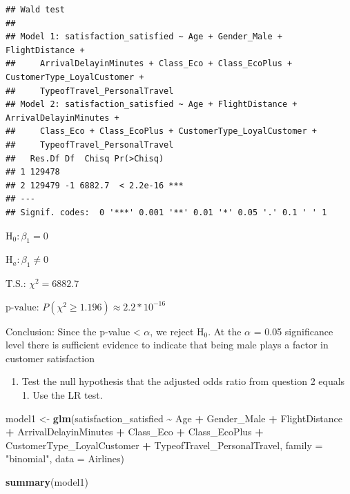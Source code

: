 \documentclass[
]{article}
\newenvironment{Shaded}{\begin{snugshade}}{\end{snugshade}}
\newcommand{\AttributeTok}[1]{\textcolor[rgb]{0.13,0.29,0.53}{#1}}
\newcommand{\FunctionTok}[1]{\textcolor[rgb]{0.13,0.29,0.53}{\textbf{#1}}}
\newcommand{\NormalTok}[1]{#1}
\newcommand{\OtherTok}[1]{\textcolor[rgb]{0.56,0.35,0.01}{#1}}
\newcommand{\SpecialCharTok}[1]{\textcolor[rgb]{0.81,0.36,0.00}{\textbf{#1}}}
\newcommand{\StringTok}[1]{\textcolor[rgb]{0.31,0.60,0.02}{#1}}
\providecommand{\tightlist}{%
  \setlength{\itemsep}{0pt}\setlength{\parskip}{0pt}}
\begin{document}
\begin{verbatim}
## Wald test
## 
## Model 1: satisfaction_satisfied ~ Age + Gender_Male + FlightDistance + 
##     ArrivalDelayinMinutes + Class_Eco + Class_EcoPlus + CustomerType_LoyalCustomer + 
##     TypeofTravel_PersonalTravel
## Model 2: satisfaction_satisfied ~ Age + FlightDistance + ArrivalDelayinMinutes + 
##     Class_Eco + Class_EcoPlus + CustomerType_LoyalCustomer + 
##     TypeofTravel_PersonalTravel
##   Res.Df Df  Chisq Pr(>Chisq)    
## 1 129478                         
## 2 129479 -1 6882.7  < 2.2e-16 ***
## ---
## Signif. codes:  0 '***' 0.001 '**' 0.01 '*' 0.05 '.' 0.1 ' ' 1
\end{verbatim}

\(\text{H}_{0}: \beta_{1} = 0\)

\(\text{H}_{a}: \beta_{1} \ne 0\)

\(\text{T.S.: } \chi^2 = 6882.7\)

\(\text{p-value: } P(\chi^2 \ge 1.196) \approx 2.2 * 10^{-16}\)

Conclusion: Since the p-value \textless{} \(\alpha\), we reject
\(\text{H}_{0}\). At the \(\alpha\) = 0.05 significance level there is
sufficient evidence to indicate that being male plays a factor in
customer satisfaction

\newpage

\begin{enumerate}
\def\labelenumi{\arabic{enumi}.}
\setcounter{enumi}{4}
\tightlist
\item
  Test the null hypothesis that the adjusted odds ratio from question 2
  equals 1. Use the LR test.
\end{enumerate}

\begin{Shaded}
\begin{Highlighting}[]
\NormalTok{model1 }\OtherTok{\textless{}{-}} \FunctionTok{glm}\NormalTok{(satisfaction\_satisfied }\SpecialCharTok{\textasciitilde{}}\NormalTok{ Age }\SpecialCharTok{+}\NormalTok{ Gender\_Male }\SpecialCharTok{+}\NormalTok{ FlightDistance }\SpecialCharTok{+}\NormalTok{ ArrivalDelayinMinutes }\SpecialCharTok{+}\NormalTok{ Class\_Eco }\SpecialCharTok{+}\NormalTok{ Class\_EcoPlus }\SpecialCharTok{+}\NormalTok{ CustomerType\_LoyalCustomer }\SpecialCharTok{+}\NormalTok{ TypeofTravel\_PersonalTravel, }\AttributeTok{family =} \StringTok{"binomial"}\NormalTok{, }\AttributeTok{data =}\NormalTok{ Airlines)}

\FunctionTok{summary}\NormalTok{(model1)}
\end{Highlighting}
\end{Shaded}
\end{document}
